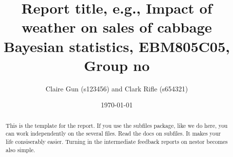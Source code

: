 \documentclass[a4paper,11pt]{article}
\author{Claire Gun (s123456) and Clark Rifle (s654321)}
\date{\today}
\title{Report title, e.g., Impact of weather on sales of cabbage\\
  Bayesian statistics, EBM805C05,  Group no}
\theoremstyle{definition}
\numberwithin{equation}{section}
\newcommand{\1}[1]{\,I_{#1}} %
\begin{document}
\maketitle

\begin{abstract}
  This is the template for the report.
  If you use the subfiles package, like we do here, you can work independently on the several files.
  Read the docs on subfiles.
  It makes your life consiserably easier. Turning in the intermediate feedback reports on nestor becomes also simple.
\end{abstract}








\appendix



\end{document}

